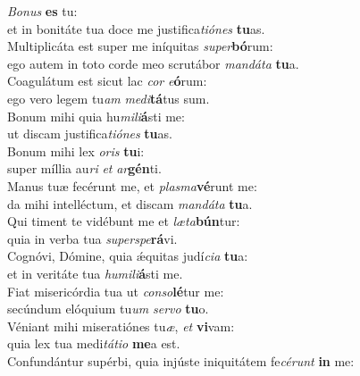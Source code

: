 \evenverse \textit{Bo}\textit{nus} \textbf{es} tu:~\*\\
\evenverse et in bonitáte tua doce me justifica\textit{ti}\textit{ó}\textit{nes} \textbf{tu}as.\\
\oddverse Multiplicáta est super me iníquitas \textit{su}\textit{per}\textbf{bó}rum:~\*\\
\oddverse ego autem in toto corde meo scrutábor \textit{man}\textit{dá}\textit{ta} \textbf{tu}a.\\
\evenverse Coagulátum est sicut lac \textit{cor} \textit{e}\textbf{ó}rum:~\*\\
\evenverse ego vero legem tu\textit{am} \textit{me}\textit{di}\textbf{tá}tus sum.\\
\oddverse Bonum mihi quia hu\textit{mi}\textit{li}\textbf{á}sti me:~\*\\
\oddverse ut discam justifica\textit{ti}\textit{ó}\textit{nes} \textbf{tu}as.\\
\evenverse Bonum mihi lex \textit{o}\textit{ris} \textbf{tu}i:~\*\\
\evenverse super míllia au\textit{ri} \textit{et} \textit{ar}\textbf{gén}ti.\\
\oddverse Manus tuæ fecérunt me, et \textit{plas}\textit{ma}\textbf{vé}runt me:~\*\\
\oddverse da mihi intelléctum, et discam \textit{man}\textit{dá}\textit{ta} \textbf{tu}a.\\
\evenverse Qui timent te vidébunt me et \textit{læ}\textit{ta}\textbf{bún}tur:~\*\\
\evenverse quia in verba tua \textit{su}\textit{per}\textit{spe}\textbf{rá}vi.\\
\oddverse Cognóvi, Dómine, quia ǽquitas judí\textit{ci}\textit{a} \textbf{tu}a:~\*\\
\oddverse et in veritáte tua \textit{hu}\textit{mi}\textit{li}\textbf{á}sti me.\\
\evenverse Fiat misericórdia tua ut \textit{con}\textit{so}\textbf{lé}tur me:~\*\\
\evenverse secúndum elóquium tu\textit{um} \textit{ser}\textit{vo} \textbf{tu}o.\\
\oddverse Véniant mihi miseratiónes tu\textit{æ}, \textit{et} \textbf{vi}vam:~\*\\
\oddverse quia lex tua medi\textit{tá}\textit{ti}\textit{o} \textbf{me}a est.\\
\evenverse Confundántur supérbi, quia injúste iniquitátem fe\textit{cé}\textit{runt} \textbf{in} me:~\*\\
